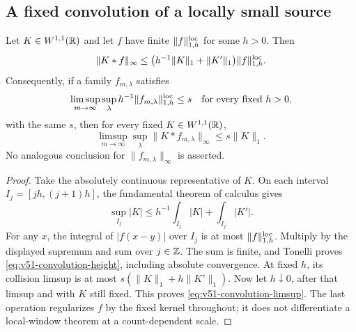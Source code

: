 \subsection{A fixed convolution of a locally small source}
\begin{lemma}
\label{lem:v51-local-convolution-height}
Let $K\in W^{1,1}(\mathbb R)$ and let $f$ have finite
$\|f\|_{1,h}^{\rm loc}$ for some $h>0$. Then
\begin{equation}\label{eq:v51-convolution-height}
 \|K*f\|_\infty\le
 \bigl(h^{-1}\|K\|_1+\|K'\|_1\bigr)\|f\|_{1,h}^{\rm loc}.
\end{equation}
Consequently, if a family $f_{m,\lambda}$ satisfies
\[
 \limsup_{m\to\infty}\sup_\lambda
       h^{-1}\|f_{m,\lambda}\|_{1,h}^{\rm loc}\le s
                 \quad\hbox{for every fixed }h>0,
\]
with the same $s$, then for every fixed $K\in W^{1,1}(\mathbb R)$,
\begin{equation}\label{eq:v51-convolution-limsup}
 \limsup_{m\to\infty}\sup_\lambda\|K*f_{m,\lambda}\|_\infty
                                                   \le s\|K\|_1.
\end{equation}
No analogous conclusion for $\|f_{m,\lambda}\|_\infty$ is asserted.
\end{lemma}
\begin{proof}
Take the absolutely continuous representative of $K$. On each interval
$I_j=[jh,(j+1)h]$, the fundamental theorem of calculus gives
\[
 \sup_{I_j}|K|\le h^{-1}\int_{I_j}|K|+\int_{I_j}|K'|.
\]
For any $x$, the integral of $|f(x-y)|$ over $I_j$ is at most
$\|f\|_{1,h}^{\rm loc}$. Multiply by the displayed supremum and
sum over $j\in\mathbb Z$. The sum is finite, and Tonelli proves
\eqref{eq:v51-convolution-height}, including absolute convergence.
At fixed $h$, its collision limsup is at most
$s(\|K\|_1+h\|K'\|_1)$. Now let $h\downarrow0$, after that
limsup and with $K$ still fixed. This proves
\eqref{eq:v51-convolution-limsup}. The last operation regularizes
$f$ by the fixed kernel throughout; it does not differentiate a
local-window theorem at a count-dependent scale.
\end{proof}

